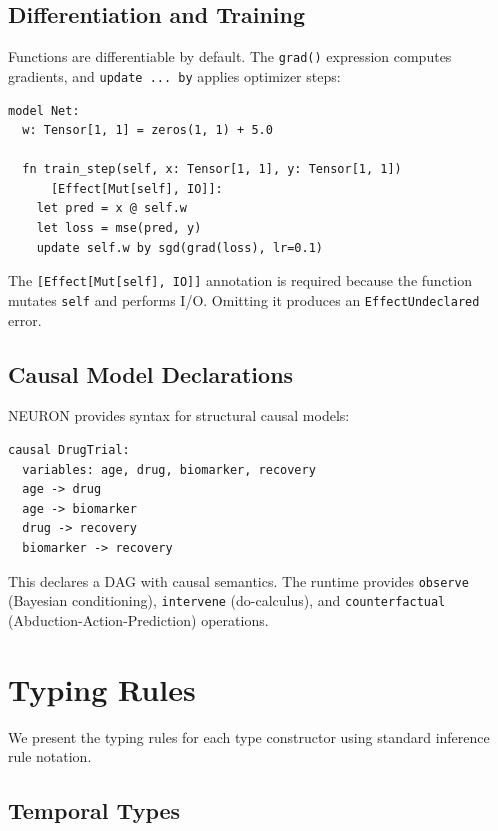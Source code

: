 \documentclass[11pt,a4paper]{article}
\newcommand{\ty}[1]{\texttt{#1}}
\begin{document}
\subsection{Differentiation and Training}

Functions are differentiable by default. The \ty{grad()} expression computes gradients, and \ty{update ... by} applies optimizer steps:

\begin{lstlisting}
model Net:
  w: Tensor[1, 1] = zeros(1, 1) + 5.0

  fn train_step(self, x: Tensor[1, 1], y: Tensor[1, 1])
      [Effect[Mut[self], IO]]:
    let pred = x @ self.w
    let loss = mse(pred, y)
    update self.w by sgd(grad(loss), lr=0.1)
\end{lstlisting}

The \ty{[Effect[Mut[self], IO]]} annotation is required because the function mutates \ty{self} and performs I/O. Omitting it produces an \ty{EffectUndeclared} error.

\subsection{Causal Model Declarations}

NEURON provides syntax for structural causal models:

\begin{lstlisting}
causal DrugTrial:
  variables: age, drug, biomarker, recovery
  age -> drug
  age -> biomarker
  drug -> recovery
  biomarker -> recovery
\end{lstlisting}

This declares a DAG with causal semantics. The runtime provides \ty{observe} (Bayesian conditioning), \ty{intervene} (do-calculus), and \ty{counterfactual} (Abduction-Action-Prediction) operations.


\section{Typing Rules}

We present the typing rules for each type constructor using standard inference rule notation.

\subsection{Temporal Types}
\label{sec:temporal}
\end{document}
